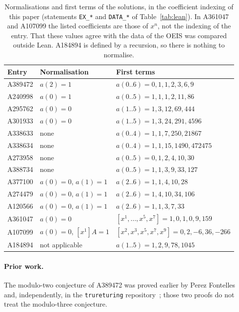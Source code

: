 \documentclass[11pt]{article}
\theoremstyle{remark}
\begin{document}
\begin{table}[ht]\centering\small
\begin{tabular}{@{}lll@{}}\toprule
Entry & Normalisation & First terms\\\midrule
A389472 & $a(2)=1$ & $a(0..6)=0,1,1,2,3,6,9$\\
A240998 & $a(0)=1$ & $a(0..5)=1,1,1,2,11,86$\\
A295762 & $a(0)=0$ & $a(1..5)=1,3,12,69,444$\\
A301933 & $a(0)=0$ & $a(1..5)=1,3,24,291,4596$\\
A338633 & none & $a(0..4)=1,1,7,250,21867$\\
A338634 & none & $a(0..4)=1,1,15,1490,472475$\\
A273958 & none & $a(0..5)=0,1,2,4,10,30$\\
A388734 & none & $a(0..5)=1,1,3,9,33,127$\\
A377100 & $a(0)=0$, $a(1)=1$ & $a(2..6)=1,1,4,10,28$\\
A274479 & $a(0)=0$, $a(1)=1$ & $a(2..6)=1,4,10,34,106$\\
A120566 & $a(0)=0$, $a(1)=1$ & $a(2..6)=1,1,3,7,33$\\
A361047 & $a(0)=0$ & $[x^1,\dots,x^5,x^7]=1,0,1,0,9,159$\\
A107099 & $a(0)=0$, $[x^1]A=1$ & $[x^2,x^3,x^5,x^7,x^9]=0,2,-6,36,-266$\\
A184894 & not applicable & $a(1..5)=1,2,9,78,1045$\\\bottomrule
\end{tabular}
\caption{Normalisations and first terms of the solutions, in the coefficient
indexing of this paper (statements \texttt{EX\_*} and \texttt{DATA\_*} of
Table~\ref{tab:lean}). In A361047 and A107099 the listed coefficients are those
of $x^n$, not the indexing of the entry. That these values agree with the data
of the OEIS was compared outside Lean. A184894 is defined by a recursion, so
there is nothing to normalise.}\label{tab:norm}
\end{table}

\paragraph{Prior work.} The modulo-two conjecture of A389472 was proved
earlier by Perez Fontelles~\cite{pf389472} and, independently, in the
\texttt{trureturing} repository~\cite{tru389472}; those two proofs do not treat
the modulo-three conjecture.
\end{document}
